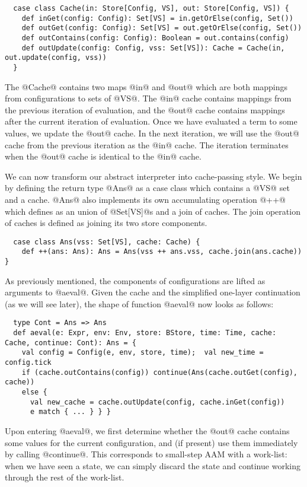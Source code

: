 \documentclass[acmsmall, screen]{acmart}\settopmatter{}
\begin{document}
\begin{lstlisting}
  case class Cache(in: Store[Config, VS], out: Store[Config, VS]) {
    def inGet(config: Config): Set[VS] = in.getOrElse(config, Set())
    def outGet(config: Config): Set[VS] = out.getOrElse(config, Set())
    def outContains(config: Config): Boolean = out.contains(config)
    def outUpdate(config: Config, vss: Set[VS]): Cache = Cache(in, out.update(config, vss))
  }
\end{lstlisting}

The @Cache@ contains two maps @in@ and @out@ which are both mappings from configurations
to sets of @VS@. The @in@ cache contains mappings from the previous iteration of evaluation,
and the @out@ cache contains mappings after the current iteration of evaluation.
Once we have evaluated a term to some values, we update the @out@ cache. In the next
iteration, we will use the @out@ cache from the previous iteration as the @in@ cache.
The iteration terminates when the @out@ cache is identical to the @in@ cache.

We can now transform our abstract interpreter into cache-passing style. We begin by defining the
return type @Ans@ as a case class which contains a @VS@ set and a cache. @Ans@ also implements
its own accumulating operation @++@ which defines as an union of @Set[VS]@s and a join of caches.
The join operation of caches is defined as joining its two store components.

\begin{lstlisting}
  case class Ans(vss: Set[VS], cache: Cache) {
    def ++(ans: Ans): Ans = Ans(vss ++ ans.vss, cache.join(ans.cache)) }
\end{lstlisting}

As previously mentioned, the components of configurations are lifted as arguments to
@aeval@. Given the cache and the simplified one-layer continuation (as we will see later),
the shape of function @aeval@ now looks as follows:

\begin{lstlisting}
  type Cont = Ans => Ans
  def aeval(e: Expr, env: Env, store: BStore, time: Time, cache: Cache, continue: Cont): Ans = {
    val config = Config(e, env, store, time);  val new_time = config.tick
    if (cache.outContains(config)) continue(Ans(cache.outGet(config), cache))
    else {
      val new_cache = cache.outUpdate(config, cache.inGet(config))
      e match { ... } } }
\end{lstlisting}

Upon entering @aeval@, we first determine whether the @out@ cache contains some values
for the current configuration, and (if present) use them immediately by
calling @continue@.
This corresponds to small-step AAM with a work-list: when we have seen a state,
we can simply discard the state and continue working through the rest of the work-list.
\end{document}
